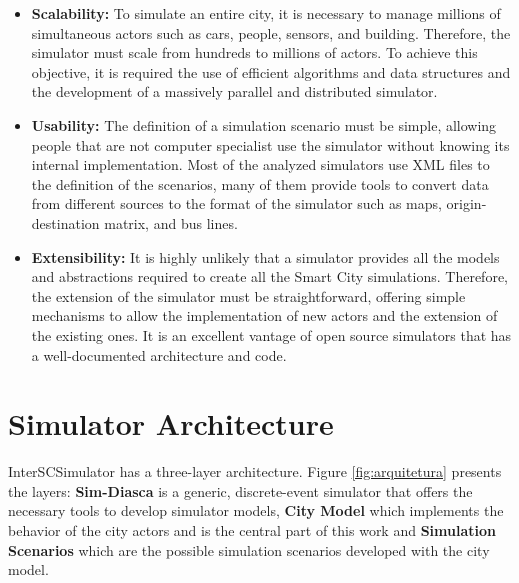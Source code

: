 \begin{itemize}

\item \textbf{Scalability: } To simulate an entire city, it is necessary to manage millions of simultaneous actors such as cars, people, sensors, and building. Therefore, the simulator must scale from hundreds to millions of actors. To achieve this objective, it is required the use of efficient algorithms and data structures and the development of a massively parallel and distributed simulator.

\item \textbf{Usability: } The definition of a simulation scenario must be simple, allowing people that are not computer specialist use the simulator without knowing its internal implementation. Most of the analyzed simulators use XML files to the definition of the scenarios, many of them provide tools to convert data from different sources to the format of the simulator such as maps, origin-destination matrix, and bus lines.

\item \textbf{Extensibility: } It is highly unlikely that a simulator provides all the models and abstractions required to create all the Smart City simulations. Therefore, the extension of the simulator must be straightforward, offering simple mechanisms to allow the implementation of new actors and the extension of the existing ones. It is an excellent vantage of open source simulators that has a well-documented architecture and code.

\end{itemize}

\section{Simulator Architecture}
\label{sub:architecture}

InterSCSimulator has a three-layer architecture. Figure \ref{fig:arquitetura} presents the layers: \textbf{Sim-Diasca} is a generic, discrete-event simulator that offers the necessary tools to develop simulator models, \textbf{City Model} which implements the behavior of the city actors and is the central part of this work and \textbf{Simulation Scenarios} which are the possible simulation scenarios developed with the city model.

